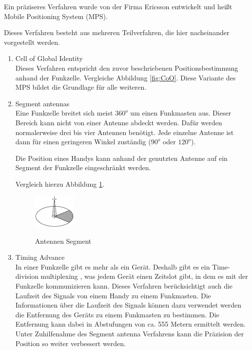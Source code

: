 Ein präziseres Verfahren wurde von der Firma Ericsson entwickelt und heißt Mobile Positioning System (MPS). 
\cite[S. 207 - 208]{Schiller2004}

Dieses Verfahren besteht aus mehreren Teilverfahren, die hier nacheinander vorgestellt werden.

\begin{enumerate}
\item Cell of Global Identity \\
Dieses Verfahren entspricht den zuvor beschriebenen Positionsbestimmung anhand der Funkzelle. Vergleiche Abbildung \ref{fig:CoO}. Diese Variante des MPS bildet die Grundlage für alle weiteren.
\item Segment antennas \\
Eine Funkzelle breitet sich meist $360^{o}$ um einen Funkmasten aus. Dieser Bereich kann nicht von einer Antenne abdeckt werden. Dafür werden normalerweise drei bis vier Antennen benötigt. Jede einzelne Antenne ist dann für einen geringeren Winkel zuständig ($90^{o}$ oder $120^{o}$).

Die Position eines Handys kann anhand der genutzten Antenne auf ein Segment der Funkzelle eingeschränkt werden.
\cite[S. 208]{Schiller2004}

Vergleich hierzu Abbildung \ref{fig:SA}.

\begin{figure}[h]
\centering
\includegraphics[width=0.2\textwidth]{ref/images/SegmentAntennas.PNG}
\caption[Antennen Segment]{Antennen Segment}
\label{fig:SA}
\cite[S. 209]{Schiller2004}
\end{figure}

\item Timing Advance \\
In einer Funkzelle gibt es mehr als ein Gerät. Deshalb gibt es ein \glqq Time-division multiplexing \grqq , was jedem Gerät einen Zeitslot gibt, in dem es mit der Funkzelle kommunizieren kann. Dieses Verfahren berücksichtigt auch die Laufzeit des Signals von einem Handy zu einem Funkmasten. Die Informationen über die Laufzeit des Signals können dazu verwendet werden die Entfernung des Geräts zu einem Funkmasten zu bestimmen. Die Entfernung kann dabei in Abstufungen von ca. 555 Metern ermittelt werden. Unter Zuhilfenahme des Segment antenna Verfahrens kann die Präzision der Position so weiter verbessert werden.
\cite[S. 208]{Schiller2004}


\end{enumerate}
